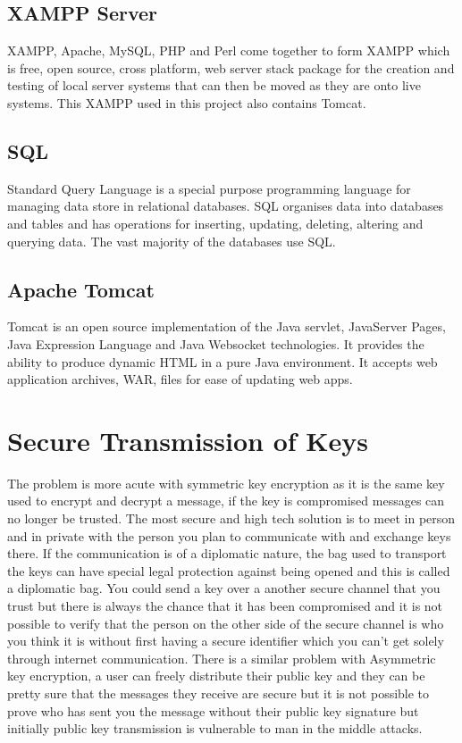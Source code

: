 \subsection{XAMPP Server}

XAMPP, Apache, MySQL, PHP and Perl come together to form XAMPP which is free, open source, cross platform, web server stack package for the creation and testing of local server systems that can then be moved as they are onto live systems. This XAMPP used in this project also contains Tomcat.

\subsection{SQL}

Standard Query Language is a special purpose programming language for managing data store in relational databases. SQL organises data into databases and tables and has operations for inserting, updating, deleting, altering and querying data. The vast majority of the databases use SQL.

\subsection{Apache Tomcat}

Tomcat is an open source implementation of the Java servlet, JavaServer Pages, Java Expression Language and Java Websocket technologies. It provides the ability to produce dynamic HTML in a pure Java environment. It accepts web application archives, WAR, files for ease of updating web apps.

\section{Secure Transmission of Keys}

The problem is more acute with symmetric key encryption as it is the same key used to encrypt and decrypt a message, if the key is compromised messages can no longer be trusted. The most secure and high tech solution is to meet in person and in private with the person you plan to communicate with and exchange keys there. If the communication is of a diplomatic nature, the bag used to transport the keys can have special legal protection against being opened and this is called a diplomatic bag\cite{dipbag}. You could send a key over a another secure channel that you trust but there is always the chance that it has been compromised and it is not possible to verify that the person on the other side of the secure channel is who you think it is without first having a secure identifier which you can't get solely through internet communication. There is a similar problem with Asymmetric key encryption, a user can freely distribute their public key and they can be pretty sure that the messages they receive are secure but it is not possible to prove who has sent you the message without their public key signature but initially public key transmission is vulnerable to man in the middle attacks.

